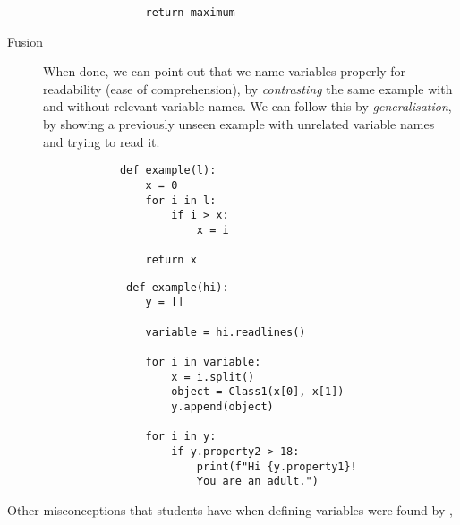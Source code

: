 \begin{description}
\begin{minipage}[t]{0.45\columnwidth}
\begin{verbatim}
                return maximum
      \end{verbatim}
    \end{minipage}
\newline
    \item [Fusion] When done, we can point out that we name variables 
properly for readability (ease of comprehension), by \emph{contrasting}
 the same example with and without relevant variable names. We can 
follow this by \emph{generalisation}, by showing a previously unseen 
example with unrelated variable names and trying to read it.
    
    \hfill
     \begin{minipage}[t]{0.45\columnwidth}
        \begin{verbatim}
            def example(l):
                x = 0
                for i in l:
                    if i > x:
                        x = i
    
                return x
        \end{verbatim}
    \end{minipage}
\hfill
    \begin{minipage}[t]{0.45\columnwidth}
        \begin{verbatim}
             def example(hi):
                y = []
                
                variable = hi.readlines()
    
                for i in variable:
                    x = i.split()
                    object = Class1(x[0], x[1])
                    y.append(object)
                    
                for i in y:
                    if y.property2 > 18:
                        print(f"Hi {y.property1}! 
                        You are an adult.")
        \end{verbatim}
    \end{minipage}
\hfill
    
\end{description}

Other misconceptions that students have when defining variables were found by 
\textcite{GuoMarkelZhang2020},

